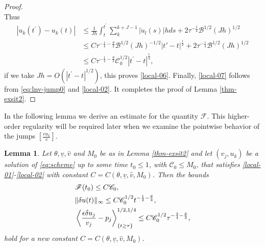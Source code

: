 \documentclass[a4paper,oneside,11pt]{article}
\numberwithin{equation}{section}
\newtheorem{lemma}{Lemma}[section]
\begin{document}
\begin{proof}
\[\]
Thus
\[\begin{aligned}
\displaystyle 
\left| {{u}_{k}\left( {t}^{\prime }\right)  - {u}_{k}(t) }\right| & \leq  \frac{1}{Jh}\int_{t}^{{t}^{\prime }}\mathop{\sum }\limits_{k}^{{k + J - 1}}\left| {{\dot{u}}_{l}\left( s\right) }\right| {hds} + 2\tau^{-\frac14}\mathscr{B}^{1/2}(Jh)^{1/2}\\
&\leq C\tau^{-\frac14-\frac{\theta}{2}}\mathscr{B}^{1/2}(Jh)^{-1/2}|t'-t|^{\frac12}+2\tau^{-\frac14}\mathscr{B}^{1/2}(Jh)^{1/2}\\
& \leq  C\tau^{-\frac14-\frac{\theta}{2}}\mathscr{C}_0^{1/2}{\left| {t}^{\prime } - t\right| }^{\frac14},
\end{aligned}\]
if we take \({Jh} = O( {| {t}^{\prime } - t| }^{1/2})\), this proves \eqref{local-06}. Finally, \eqref{local-07} follows from \eqref{eq:lnv-jump0} and \eqref{local-02}. It completes the proof of Lemma \ref{thm-exsit2}.
\end{proof}


In the following lemma we derive an estimate for the quantity \(\mathscr{F}\). This higher-order regularity will be required later when we examine the pointwise behavior of the jumps \(\left\lbrack  \frac{\epsilon {u}_{x}}{v}\right\rbrack\).

\begin{lemma}\label{thm-exsit3}
Let \(\theta, \underline{v}, \hat{v}\) and \(M_{0}\) be as in Lemma \ref{thm-exsit2} and let \((v_{j},u_{k})\) be a solution of \eqref{eq:scheme} up to some time \(t_0\leq1\), with \(\mathscr{C}_{0}\leq M_{0}\), that satisfies \eqref{local-01}-\eqref{local-02} with constant \(C=C(\theta, \underline{v}, \hat{v}, M_{0})\). Then the bounds
\begin{align}
\displaystyle  &\mathscr{F}(t_0)\leq C\mathscr{C}_0, \label{local-11}\\
&\|\delta u(t)\|_{\infty}\leq C\mathscr{C}_0^{1/2}t^{-\frac{1}{2}-\frac{\theta}{4}},\label{local-12}\\
&\left\langle\frac{\epsilon\delta u_{j}}{v_{j}}-p_{j}\right\rangle_{\{t\geq \tau\}}^{1/2,1/4}\leq C\mathscr{C}_0^{1/2}\tau^{-\frac{3}{4}-\frac{\theta}{2}},\label{local-13}
\end{align}
hold for a new constant \(C=C(\theta, \underline{v}, \hat{v}, M_{0})\).
\end{lemma}
\end{document}
